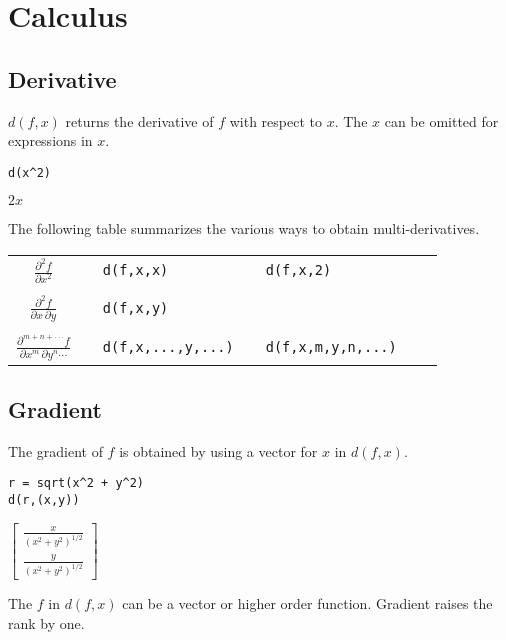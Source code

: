 \section{Calculus}

\subsection{Derivative}

$d(f,x)$ returns the derivative of $f$ with respect to $x$.
The $x$ can be omitted for expressions in $x$.

{\color{blue}
\begin{verbatim}
d(x^2)
\end{verbatim}
}

\noindent
$2x$

\bigskip
\noindent
The following table summarizes the various ways to obtain multi-derivatives.

\begin{center}
\begin{tabular}{cllllll}
$\displaystyle{\frac{\partial^2f}{\partial x^2}}$ & & \verb$d(f,x,x)$ & & \verb$d(f,x,2)$ \\
\\
$\displaystyle{\frac{\partial^2f}{\partial x\,\partial y}}$ & & \verb$d(f,x,y)$ \\
\\
$\displaystyle{\frac{\partial^{m+n+\cdot\cdot\cdot} f}{\partial x^m\,\partial y^n\cdots}}$ & &
\verb$d(f,x,...,y,...)$ & & \verb$d(f,x,m,y,n,...)$ \\
\end{tabular}
\end{center}

\subsection{Gradient}

The gradient of $f$ is obtained by using a vector for $x$ in $d(f,x)$.

{\color{blue}
\begin{verbatim}
r = sqrt(x^2 + y^2)
d(r,(x,y))
\end{verbatim}
}

\noindent
$\begin{bmatrix}\frac{x}{(x^2+y^2)^{1/2}}\\ \frac{y}{(x^2+y^2)^{1/2}}\end{bmatrix}$

\bigskip
\noindent
The $f$ in $d(f,x)$ can be a vector or higher order function.
Gradient raises the rank by one.


